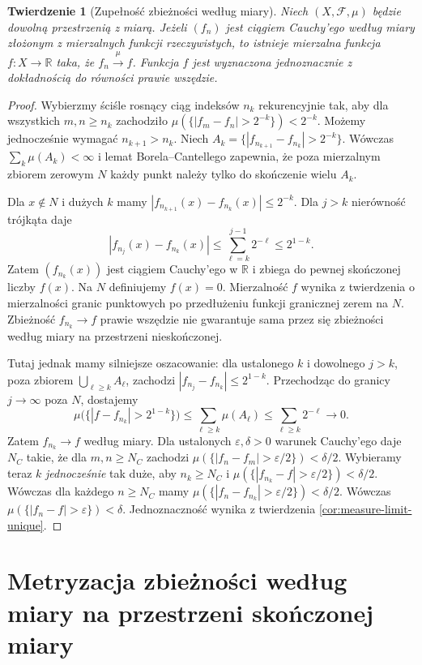\documentclass[11pt,a4paper,oneside]{book}
\numberwithin{equation}{chapter}
\theoremstyle{plain}
\newtheorem{twierdzenie}{Twierdzenie}[chapter]
\theoremstyle{definition}
\theoremstyle{remark}
\begin{document}
\begin{twierdzenie}[Zupełność zbieżności według miary]
\label{thm:cauchy-measure-complete-9}
Niech $(X,\mathcal F,\mu)$ będzie dowolną przestrzenią
z miarą. Jeżeli $(f_n)$ jest ciągiem Cauchy'ego według
miary złożonym z mierzalnych funkcji rzeczywistych,
to istnieje mierzalna funkcja $f:X\to\mathbb R$ taka,
że $f_n\xrightarrow{\mu}f$. Funkcja $f$ jest wyznaczona
jednoznacznie z dokładnością do równości prawie wszędzie.
\end{twierdzenie}
\begin{proof}
Wybierzmy ściśle rosnący ciąg indeksów $n_k$
rekurencyjnie tak, aby dla wszystkich $m,n\ge n_k$
zachodziło
$\mu(\{|f_m-f_n|>2^{-k}\})<2^{-k}$.
Możemy jednocześnie wymagać $n_{k+1}>n_k$.
Niech
$A_k=\{|f_{n_{k+1}}-f_{n_k}|>2^{-k}\}$.
Wówczas $\sum_k\mu(A_k)<\infty$ i lemat
Borela--Cantellego zapewnia, że poza mierzalnym
zbiorem zerowym $N$ każdy punkt należy tylko do
skończenie wielu $A_k$.

Dla $x\notin N$ i dużych $k$ mamy
$|f_{n_{k+1}}(x)-f_{n_k}(x)|\le2^{-k}$.
Dla $j>k$ nierówność trójkąta daje
\[
|f_{n_j}(x)-f_{n_k}(x)|
\le\sum_{\ell=k}^{j-1}2^{-\ell}\le2^{1-k}.
\]
Zatem $(f_{n_k}(x))$ jest ciągiem Cauchy'ego w
$\mathbb R$ i zbiega do pewnej skończonej liczby
$f(x)$. Na $N$ definiujemy $f(x)=0$.
Mierzalność $f$ wynika z twierdzenia o mierzalności
granic punktowych po przedłużeniu funkcji granicznej
zerem na $N$. Zbieżność $f_{n_k}\to f$ prawie
wszędzie nie gwarantuje sama przez się zbieżności
według miary na przestrzeni nieskończonej.

Tutaj jednak mamy silniejsze oszacowanie: dla
ustalonego $k$ i dowolnego $j>k$, poza zbiorem
$\bigcup_{\ell\ge k}A_\ell$, zachodzi
$|f_{n_j}-f_{n_k}|\le2^{1-k}$.
Przechodząc do granicy $j\to\infty$ poza $N$,
dostajemy
\[
\mu\bigl(\{|f-f_{n_k}|>2^{1-k}\}\bigr)
\le\sum_{\ell\ge k}\mu(A_\ell)
\le\sum_{\ell\ge k}2^{-\ell}\longrightarrow0.
\]
Zatem $f_{n_k}\to f$ według miary.
Dla ustalonych $\varepsilon,\delta>0$ warunek
Cauchy'ego daje $N_C$ takie, że dla $m,n\ge N_C$
zachodzi
$\mu(\{|f_n-f_m|>\varepsilon/2\})<\delta/2$.
Wybieramy teraz $k$ \emph{jednocześnie} tak duże,
aby $n_k\ge N_C$ i
$\mu(\{|f_{n_k}-f|>\varepsilon/2\})<\delta/2$.
Wówczas dla każdego $n\ge N_C$ mamy
$\mu(\{|f_n-f_{n_k}|>\varepsilon/2\})<\delta/2$.
Wówczas $\mu(\{|f_n-f|>\varepsilon\})<\delta$.
Jednoznaczność wynika z twierdzenia
\ref{cor:measure-limit-unique}.
\end{proof}

\section{Metryzacja zbieżności według miary na przestrzeni skończonej miary}
\end{document}
